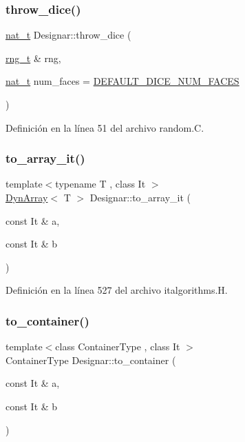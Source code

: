 \subsubsection{\texorpdfstring{throw\+\_\+dice()}{throw\_dice()}}
{\footnotesize\ttfamily \hyperlink{namespace_designar_aa72662848b9f4815e7bf31a7cf3e33d1}{nat\+\_\+t} Designar\+::throw\+\_\+dice (\begin{DoxyParamCaption}\item[{\hyperlink{namespace_designar_a9ca84e2ff5daa62ebc4dab52f3a6c855}{rng\+\_\+t} \&}]{rng,  }\item[{\hyperlink{namespace_designar_aa72662848b9f4815e7bf31a7cf3e33d1}{nat\+\_\+t}}]{num\+\_\+faces = {\ttfamily \hyperlink{namespace_designar_af614c8a444ce943532075892ad401662}{D\+E\+F\+A\+U\+L\+T\+\_\+\+D\+I\+C\+E\+\_\+\+N\+U\+M\+\_\+\+F\+A\+C\+ES}} }\end{DoxyParamCaption})}



Definición en la línea 51 del archivo random.\+C.

\mbox{\label{namespace_designar_a65634dc64216572c3a7bba9a2c47dbf4}} 
\subsubsection{\texorpdfstring{to\+\_\+array\+\_\+it()}{to\_array\_it()}}
{\footnotesize\ttfamily template$<$typename T , class It $>$ \\
\hyperlink{class_designar_1_1_dyn_array}{Dyn\+Array}$<$ T $>$ Designar\+::to\+\_\+array\+\_\+it (\begin{DoxyParamCaption}\item[{const It \&}]{a,  }\item[{const It \&}]{b }\end{DoxyParamCaption})}



Definición en la línea 527 del archivo italgorithms.\+H.

\mbox{\label{namespace_designar_a6a10446f00b4d600010819b75113190b}} 
\subsubsection{\texorpdfstring{to\+\_\+container()}{to\_container()}}
{\footnotesize\ttfamily template$<$class Container\+Type , class It $>$ \\
Container\+Type Designar\+::to\+\_\+container (\begin{DoxyParamCaption}\item[{const It \&}]{a,  }\item[{const It \&}]{b }\end{DoxyParamCaption})}



